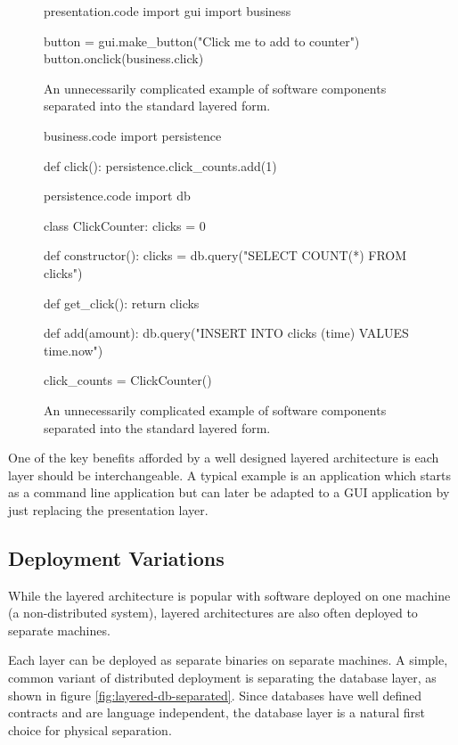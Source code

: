 \begin{figure}[H]
\begin{code}[style=python]{presentation.code}
import gui
import business

button = gui.make_button("Click me to add to counter")
button.onclick(business.click)
\end{code}
\caption{An unnecessarily complicated example of software components separated into the standard layered form.}
\label{fig:standard-form-example}
\end{figure}

\begin{figure}[H]
\ContinuedFloat
\begin{code}[style=python]{business.code}
import persistence

def click():
    persistence.click_counts.add(1)
\end{code}

\begin{code}[style=python]{persistence.code}
import db

class ClickCounter:
    clicks = 0

    def constructor():
        clicks = db.query("SELECT COUNT(*) FROM clicks")

    def get_click():
        return clicks

    def add(amount):
        db.query("INSERT INTO clicks (time) VALUES {{time.now}}")

click_counts = ClickCounter()
\end{code}
\caption{An unnecessarily complicated example of software components separated into the standard layered form.}
\end{figure}

One of the key benefits afforded by a well designed layered architecture is each layer should be interchangeable.
A typical example is an application which starts as a command line application
but can later be adapted to a GUI application by just replacing the presentation layer.

\subsection{Deployment Variations}

While the layered architecture is popular with software deployed on one machine (a non-distributed system),
layered architectures are also often deployed to separate machines.

Each layer can be deployed as separate binaries on separate machines.
A simple, common variant of distributed deployment is separating the database layer,
as shown in figure \ref{fig:layered-db-separated}.
Since databases have well defined contracts and are language independent,
the database layer is a natural first choice for physical separation.

